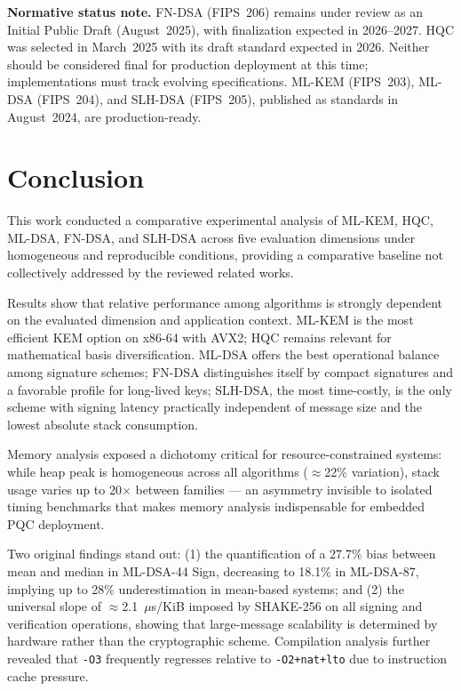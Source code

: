 \documentclass[12pt]{article}
\begin{document}
\textbf{Normative status note.} FN-DSA (FIPS~206) remains under review as
an Initial Public Draft (August~2025), with finalization expected in
2026--2027. HQC was selected in March~2025 with its draft standard expected
in 2026. Neither should be considered final for production deployment at
this time; implementations must track evolving specifications. ML-KEM
(FIPS~203), ML-DSA (FIPS~204), and SLH-DSA (FIPS~205), published as
standards in August~2024, are production-ready.

\section{Conclusion}
\label{sec:conclusao}
This work conducted a comparative experimental analysis of ML-KEM, HQC,
ML-DSA, FN-DSA, and SLH-DSA across five evaluation dimensions under
homogeneous and reproducible conditions, providing a comparative baseline
not collectively addressed by the reviewed related works.

Results show that relative performance among algorithms is strongly
dependent on the evaluated dimension and application context. ML-KEM is the
most efficient KEM option on x86-64 with AVX2; HQC remains relevant for
mathematical basis diversification. ML-DSA offers the best operational
balance among signature schemes; FN-DSA distinguishes itself by compact
signatures and a favorable profile for long-lived keys; SLH-DSA, the most
time-costly, is the only scheme with signing latency practically independent
of message size and the lowest absolute stack consumption.

Memory analysis exposed a dichotomy critical for resource-constrained
systems: while heap peak is homogeneous across all algorithms ($\approx$22\%
variation), stack usage varies up to 20$\times$ between families --- an
asymmetry invisible to isolated timing benchmarks that makes memory analysis
indispensable for embedded PQC deployment.

Two original findings stand out: (1) the quantification of a 27.7\% bias
between mean and median in ML-DSA-44 Sign, decreasing to 18.1\% in
ML-DSA-87, implying up to 28\% underestimation in mean-based systems; and
(2) the universal slope of $\approx$2.1~$\mu$s/KiB imposed by SHAKE-256 on
all signing and verification operations, showing that large-message
scalability is determined by hardware rather than the cryptographic scheme.
Compilation analysis further revealed that \texttt{-O3} frequently regresses
relative to \texttt{-O2+nat+lto} due to instruction cache pressure.
\end{document}
